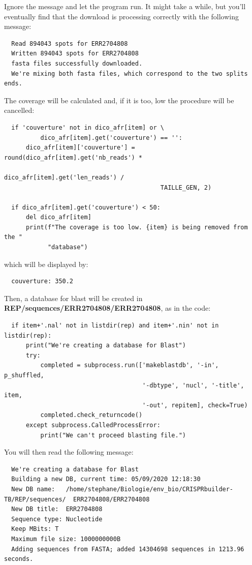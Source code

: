 \documentclass[twoside,a4paper,11pt,frenchb,openany]{report}
\begin{document}
    Ignore the message and let the program run. It might take a while, but
you'll eventually find that the download is processing correctly with
the following message:

    \begin{verbatim}
  Read 894043 spots for ERR2704808
  Written 894043 spots for ERR2704808
  fasta files successfully downloaded.
  We're mixing both fasta files, which correspond to the two splits ends.
\end{verbatim}

    The coverage will be calculated and, if it is too, low the procedure
will be cancelled:

 \begin{verbatim}
  if 'couverture' not in dico_afr[item] or \
          dico_afr[item].get('couverture') == '':
      dico_afr[item]['couverture'] = round(dico_afr[item].get('nb_reads') *
                                           dico_afr[item].get('len_reads') /
                                           TAILLE_GEN, 2)
        
  if dico_afr[item].get('couverture') < 50:
      del dico_afr[item]
      print(f"The coverage is too low. {item} is being removed from the "
            "database")
\end{verbatim}

    which will be displayed by:

    \begin{verbatim}
  couverture: 350.2        
\end{verbatim}

    Then, a database for blast will be created in
\textbf{REP/sequences/ERR2704808/ERR2704808}, as in the code:

\begin{verbatim}
  if item+'.nal' not in listdir(rep) and item+'.nin' not in listdir(rep):
      print("We're creating a database for Blast")
      try:
          completed = subprocess.run(['makeblastdb', '-in', p_shuffled,
                                      '-dbtype', 'nucl', '-title', item,
                                      '-out', repitem], check=True)
          completed.check_returncode()
      except subprocess.CalledProcessError:
          print("We can't proceed blasting file.")
\end{verbatim}

    You will then read the following message:

    \begin{verbatim}
  We're creating a database for Blast
  Building a new DB, current time: 05/09/2020 12:18:30
  New DB name:   /home/stephane/Biologie/env_bio/CRISPRbuilder-TB/REP/sequences/  ERR2704808/ERR2704808
  New DB title:  ERR2704808
  Sequence type: Nucleotide
  Keep MBits: T
  Maximum file size: 1000000000B
  Adding sequences from FASTA; added 14304698 sequences in 1213.96 seconds.
\end{verbatim}
\end{document}
